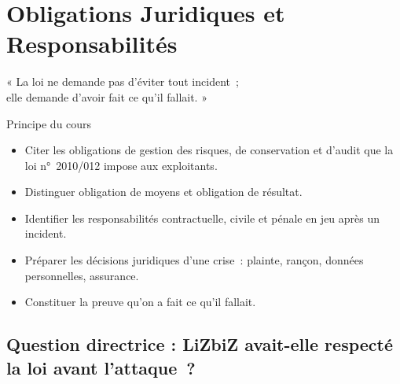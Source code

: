 
\chapter{Obligations Juridiques et Responsabilités}
\label{chap:droit}

\epigraph{%
    « La loi ne demande pas d'éviter tout incident~;\\
    elle demande d'avoir fait ce qu'il fallait. »%
}{Principe du cours}


\begin{boxobjectifs}
\begin{itemize}
    \item Citer les obligations de gestion des risques, de conservation et
          d'audit que la loi n°~2010/012 impose aux exploitants.
    \item Distinguer obligation de moyens et obligation de résultat.
    \item Identifier les responsabilités contractuelle, civile et pénale en
          jeu après un incident.
    \item Préparer les décisions juridiques d'une crise~: plainte, rançon,
          données personnelles, assurance.
    \item Constituer la preuve qu'on a fait ce qu'il fallait.
\end{itemize}
\end{boxobjectifs}

\bigskip

\section*{Question directrice : LiZbiZ avait-elle respecté la loi avant l'attaque~?}


